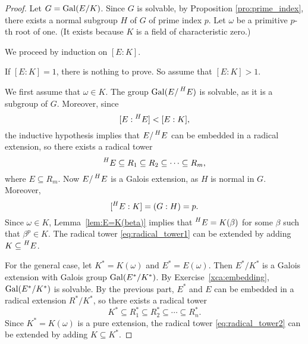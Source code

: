 \begin{proof}
    Let $G=\operatorname{Gal}(E/K)$. Since $G$ is solvable, by Proposition \ref{pro:prime_index}, 
    there exists a normal subgroup $H$ of $G$ of prime index $p$. 
    Let $\omega$ be a primitive $p$-th root of one. (It exists because $K$ is a field of characteristic zero.)
    
    We proceed by induction on $[E:K]$. 
    
    If $[E:K]=1$, there is nothing to prove. 
    So assume that $[E:K]>1$. 

    We first assume that $\omega\in K$. 
    The group $\operatorname{Gal}(E/\prescript{H}{}{E})$ is solvable, as it is a subgroup of $G$. Moreover, since 
    \[
    [E:\prescript{H}{}{E}]<[E:K],
    \]
    the inductive hypothesis implies that $E/\prescript{H}{}{E}$ can be embedded in a radical extension, so 
    there exists a radical tower
    \begin{equation}
    \label{eq:radical_tower1}
    \prescript{H}{}{E}\subseteq R_1\subseteq R_2\subseteq\cdots\subseteq R_m,
    \end{equation}
    where $E\subseteq R_m$. Now $E/\prescript{H}{}{E}$ is a Galois extension, as $H$ is normal in $G$. Moreover, 
    \[ 
    [\prescript{H}{}{E}:K]=(G:H)=p.
    \]
    Since $\omega\in K$, Lemma~\ref{lem:E=K(beta)} implies that 
    $\prescript{H}{}{E}=K(\beta)$ for some $\beta$ such that $\beta^p\in K$. The radical tower \ref{eq:radical_tower1} can be 
    extended by adding $K\subseteq \prescript{H}{}{E}$. 

    For the general case, let $K^*=K(\omega)$ and $E^*=E(\omega)$. Then $E^*/K^*$ is a Galois extension with Galois group 
    $\operatorname{Gal}(E^*/K^*)$. By Exercise~\ref{xca:embedding}, $\operatorname{Gal}(E^*/K^*)$ is solvable. By the previous part, 
    $E^*$ and $E$ can be embedded in a radical extension $R^*/K^*$, so there exists a radical tower
    \begin{equation}
    \label{eq:radical_tower2}
    K^*\subseteq R_1^*\subseteq R_2^*\subseteq\cdots\subseteq R_n^*.
    \end{equation}
    Since $K^*=K(\omega)$ is a pure extension, the radical tower \eqref{eq:radical_tower2} 
    can be extended by adding $K\subseteq K^*$. 
\end{proof}